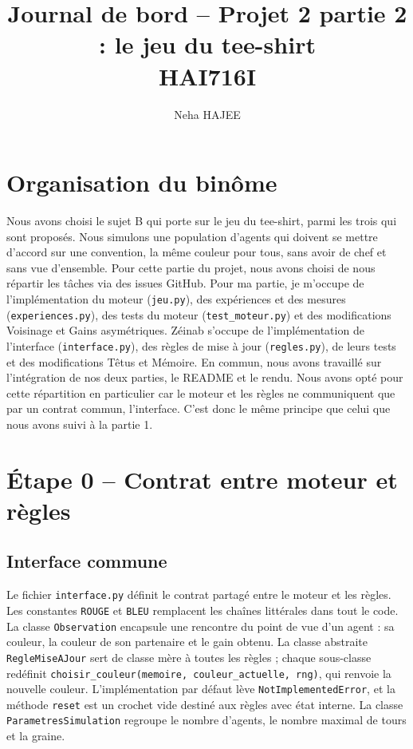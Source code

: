 \documentclass[11pt,a4paper]{article}
\title{Journal de bord -- Projet 2 partie 2 : le jeu du tee-shirt\\HAI716I}
\author{Neha HAJEE}
\date{}
\begin{document}
\maketitle

\section{Organisation du binôme}
Nous avons choisi le sujet B qui porte sur le jeu du tee-shirt, parmi les trois qui sont proposés. Nous simulons une population d'agents
qui doivent se mettre d'accord sur une convention, la même couleur pour tous, sans avoir de chef et sans vue d'ensemble. Pour cette
partie du projet, nous avons choisi de nous répartir les tâches via des issues GitHub. Pour ma partie, je m'occupe de l'implémentation du moteur
(\texttt{jeu.py}), des expériences et des mesures (\texttt{experiences.py}), des tests du moteur (\texttt{test\_moteur.py}) et des modifications
Voisinage et Gains asymétriques. Zéinab s'occupe de l'implémentation de l'interface (\texttt{interface.py}), des règles de mise à jour
(\texttt{regles.py}), de leurs tests et des modifications Têtus et Mémoire.
En commun, nous avons travaillé sur l'intégration de nos deux parties, le README et le rendu.
Nous avons opté pour cette répartition en particulier car le moteur et les règles ne communiquent que par un contrat commun, l'interface.
C'est donc le même principe que celui que nous avons suivi à la partie 1.


\section{Étape 0 -- Contrat entre moteur et règles}
\subsection{Interface commune}
Le fichier \texttt{interface.py} définit le contrat partagé entre le moteur et les règles. Les constantes \texttt{ROUGE} et
\texttt{BLEU} remplacent les chaînes littérales dans tout le code. La classe \texttt{Observation} encapsule une rencontre du point
de vue d'un agent : sa couleur, la couleur de son partenaire et le gain obtenu. La classe abstraite \texttt{RegleMiseAJour} sert de
classe mère à toutes les règles ; chaque sous-classe redéfinit \texttt{choisir\_couleur(memoire, couleur\_actuelle, rng)}, qui
renvoie la nouvelle couleur. L'implémentation par défaut lève \texttt{NotImplementedError}, et la méthode \texttt{reset} est un
crochet vide destiné aux règles avec état interne. La classe \texttt{ParametresSimulation} regroupe le nombre d'agents, le nombre
maximal de tours et la graine.
\end{document}
